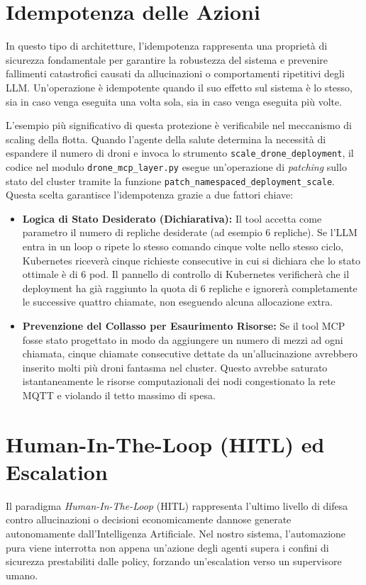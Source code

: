 \section{Idempotenza delle Azioni}
\label{sec:idempotenza_azioni}
In questo tipo di architetture, l'idempotenza rappresenta una proprietà di sicurezza fondamentale per garantire la robustezza del sistema e prevenire fallimenti catastrofici causati da allucinazioni o comportamenti ripetitivi degli LLM. Un'operazione è idempotente quando il suo effetto sul sistema è lo stesso, sia in caso venga eseguita una volta sola, sia in caso venga eseguita più volte.

L'esempio più significativo di questa protezione è verificabile nel meccanismo di scaling della flotta. Quando l'agente della salute determina la necessità di espandere il numero di droni e invoca lo strumento \texttt{scale\_drone\_deployment}, il codice nel modulo \texttt{drone\_mcp\_layer.py} esegue un'operazione di \textit{patching} sullo stato del cluster tramite la funzione \texttt{patch\_namespaced\_deployment\_scale}. 
Questa scelta garantisce l'idempotenza grazie a due fattori chiave:

\begin{itemize}
    \item \textbf{Logica di Stato Desiderato (Dichiarativa):} Il tool accetta come parametro il numero di repliche desiderate (ad esempio 6 repliche). Se l'LLM entra in un loop o ripete lo stesso comando cinque volte nello stesso ciclo, Kubernetes riceverà cinque richieste consecutive in cui si dichiara che lo stato ottimale è di 6 pod. Il pannello di controllo di Kubernetes verificherà che il deployment ha già raggiunto la quota di 6 repliche e ignorerà completamente le successive quattro chiamate, non eseguendo alcuna allocazione extra.
    \item \textbf{Prevenzione del Collasso per Esaurimento Risorse:} Se il tool MCP fosse stato progettato in modo da aggiungere un numero di mezzi ad ogni chiamata, cinque chiamate consecutive dettate da un'allucinazione avrebbero inserito molti più droni fantasma nel cluster. Questo avrebbe saturato istantaneamente le risorse computazionali dei nodi congestionato la rete MQTT e violando il tetto massimo di spesa.
\end{itemize}

\section{Human-In-The-Loop (HITL) ed Escalation}
\label{sec:hitl_escalation}
Il paradigma \textit{Human-In-The-Loop} (HITL) rappresenta l'ultimo livello di difesa contro allucinazioni o decisioni economicamente dannose generate autonomamente dall'Intelligenza Artificiale. Nel nostro sistema, l'automazione pura viene interrotta non appena un'azione degli agenti supera i confini di sicurezza prestabiliti dalle policy, forzando un'escalation verso un supervisore umano.

